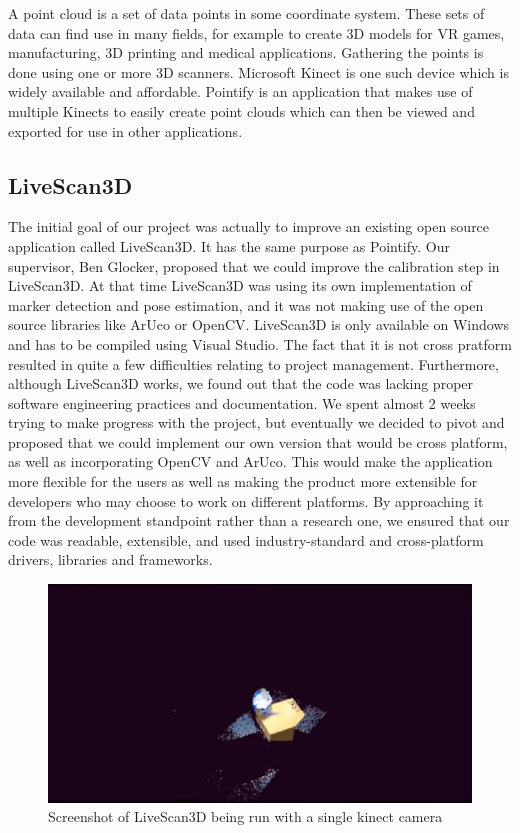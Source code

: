 \documentclass{article}
\begin{document}
A point cloud is a set of data points in some coordinate system. These sets of data can find use in many fields,
for example to create 3D models for VR games, manufacturing, 3D printing and medical applications.
Gathering the points is done using one or more 3D scanners. Microsoft Kinect is one such device which
is widely available and affordable. Pointify is an application that makes use of multiple Kinects to easily
create point clouds which can then be viewed and exported for use in other applications.

\subsection{LiveScan3D}

The initial goal of our project was actually to improve an existing open source application called LiveScan3D.
It has the same purpose as Pointify. Our supervisor, Ben Glocker, proposed that we could
improve the calibration step in LiveScan3D. At that time LiveScan3D was using its own implementation
of marker detection and pose estimation, and it was not making use of the open source libraries like
ArUco or OpenCV. LiveScan3D is only available on Windows and has to be compiled using Visual Studio.
The fact that it is not cross pratform resulted in quite a few difficulties relating to project management.
Furthermore, although LiveScan3D works, we found out that the code was lacking proper software engineering
practices and documentation. We spent almost 2 weeks trying to make progress with the project, but eventually
we decided to pivot and proposed that we could implement our own version that would be cross platform, as well
as incorporating OpenCV and ArUco. This would make the application more flexible for the users
as well as making the product more extensible for developers who may choose to work on different platforms.
By approaching it from the development standpoint rather than a research one, we ensured that our code was readable,
extensible, and used industry-standard and cross-platform drivers, libraries and frameworks.

\begin{figure}[h]
  \centering
  \includegraphics[scale=0.3]{livescan}
  \caption{Screenshot of LiveScan3D being run with a single kinect camera}
  \label{fig:livescan}
\end{figure}
\end{document}
